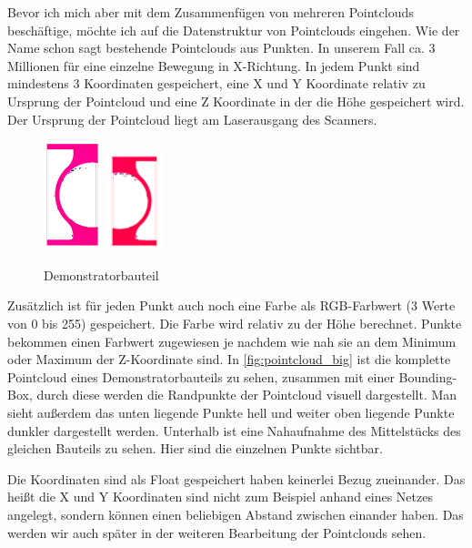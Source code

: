 \documentclass[../main.tex]{subfiles}
\begin{document}
Bevor ich mich aber mit dem Zusammenfügen von mehreren Pointclouds beschäftige,
möchte ich auf die Datenstruktur von Pointclouds eingehen. 
Wie der Name schon sagt bestehende Pointclouds aus Punkten. 
In unserem Fall ca. 3 Millionen für eine einzelne
Bewegung in X-Richtung. In jedem Punkt sind mindestens 3 Koordinaten gespeichert, 
eine X und Y Koordinate relativ zu Ursprung der Pointcloud und eine Z Koordinate 
in der die Höhe gespeichert wird. Der Ursprung der Pointcloud liegt am Laserausgang
des Scanners.

\begin{figure}
    \centering
    \includegraphics[width=0.15\textwidth]{images/demonstratorbauteil_top.PNG}
    \includegraphics[width=0.15\textwidth]{images/demonstratorbauteil_bottom.PNG}
    \caption{Demonstratorbauteil}
    \label{fig:demonstratorbauteil}
\end{figure}

Zusätzlich ist für jeden Punkt auch noch eine Farbe als RGB-Farbwert
(3 Werte von 0 bis 255) gespeichert. Die Farbe wird relativ zu der Höhe
berechnet. Punkte bekommen einen Farbwert zugewiesen je nachdem wie nah 
sie an dem Minimum oder Maximum der Z-Koordinate sind. 
In \ref{fig:pointcloud_big} ist die komplette Pointcloud eines Demonstratorbauteils 
zu sehen, zusammen mit einer Bounding-Box, durch diese werden die Randpunkte
der Pointcloud visuell dargestellt. Man sieht außerdem das unten liegende Punkte
hell und weiter oben liegende Punkte dunkler dargestellt werden.
Unterhalb ist eine Nahaufnahme des Mittelstücks des gleichen Bauteils zu sehen. 
Hier sind die einzelnen Punkte sichtbar.

Die Koordinaten sind als Float gespeichert haben keinerlei Bezug zueinander.
Das heißt die X und Y Koordinaten sind nicht zum Beispiel anhand eines Netzes
angelegt, sondern können einen beliebigen Abstand zwischen einander haben. Das
werden wir auch später in der weiteren Bearbeitung der Pointclouds sehen.
\end{document}
